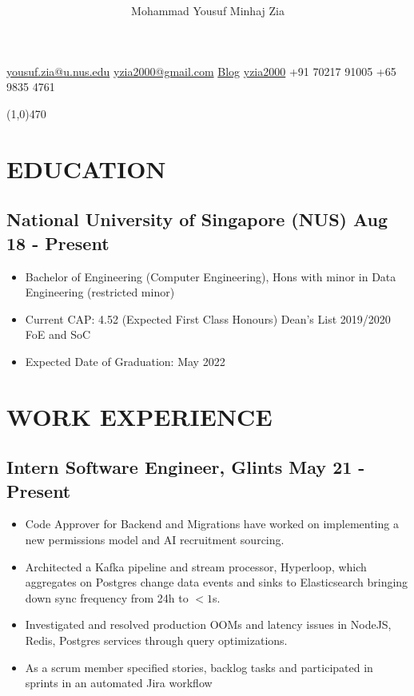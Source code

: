 \documentclass[12pts]{article}
\date{\vspace{-5ex}}
\title{\vspace{-5ex} \vspace{-5ex}}
\author{\Huge Mohammad Yousuf Minhaj Zia}
\begin{document}
\maketitle

\centerline{
\href{mailto:yousuf.zia@u.nus.edu}{yousuf.zia@u.nus.edu} \textbar \hspace{1pt}
\href{mailto:yzia2000@gmail.com}{yzia2000@gmail.com} \textbar \hspace{1pt} 
\href{https://yzia2000.github.io/blog}{Blog} \textbar \hspace{1pt} 
\href{https://github.com/yzia2000}{\faGithub \hspace{1pt} yzia2000} \textbar \hspace{1pt}
\href{https://www.linkedin.com/in/mohammad-yousuf-minhaj-zia-ab555396}{\faLinkedin} \textbar \hspace{1pt}
+91 70217 91005 \textbar \hspace{1pt} 
+65 9835 4761 
}

\line(1,0){470}\\

\section*{EDUCATION}
\subsection*{National University of Singapore (NUS) \hfill Aug 18 - Present}
\begin{itemize}
    \item Bachelor of Engineering (Computer Engineering), Hons with minor in Data Engineering (restricted minor)
    \item Current CAP: 4.52 (Expected First Class Honours) Dean's List 2019/2020 FoE and SoC
    \item Expected Date of Graduation: May 2022
\end{itemize}

\section*{WORK EXPERIENCE}
\subsection*{Intern Software Engineer, Glints \hfill May 21 - Present}
\begin{itemize}
    \item Code Approver for Backend and Migrations have worked on implementing a new permissions model and AI recruitment sourcing.
    \item Architected a Kafka pipeline and stream processor, Hyperloop, which aggregates on Postgres change data events and sinks to Elasticsearch bringing down sync frequency from 24h to $<1$s.
    \item Investigated and resolved production OOMs and latency issues in NodeJS, Redis, Postgres services through query optimizations.
    \item As a scrum member specified stories, backlog tasks and participated in sprints in an automated Jira workflow
\end{itemize}
\end{document}
